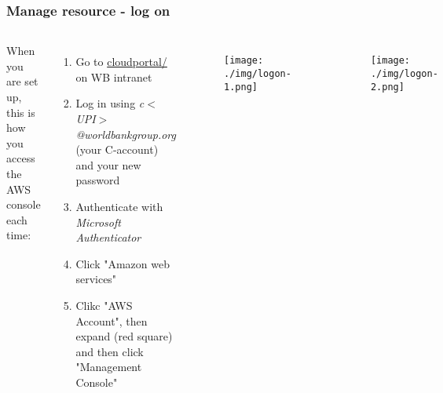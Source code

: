 \documentclass[aspectratio=169]{beamer} %
\begin{document}
\begin{frame}
	\frametitle{Manage resource - log on}
	
	
	\begin{columns}[c]
		
		
		When you are set up, this is how you access the AWS console each time:
		
		\begin{enumerate}
			\item Go to \url{cloudportal/} on WB intranet
			\item Log in using \textit{c$<$UPI$>$@worldbankgroup.org} (your C-account) and your new password
			\item Authenticate with \textit{Microsoft Authenticator}
			\item Click "Amazon web services"
			\item Clikc "AWS Account", then expand (red square) and then click "Management Console"
			
		\end{enumerate}
		
		\begin{figure}
			\centering
			\texttt{[image: ./img/logon-1.png]}
		\end{figure}
		\vspace{.2cm}
		\begin{figure}
			\centering
			\texttt{[image: ./img/logon-2.png]}
		\end{figure}
	\end{columns}
\end{frame}
\end{document}
